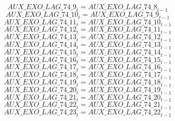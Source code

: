 \begin{dmath}
{AUX\_EXO\_LAG\_74\_9}_{t}={AUX\_EXO\_LAG\_74\_8}_{t-1}
\end{dmath}
\begin{dmath}
{AUX\_EXO\_LAG\_74\_10}_{t}={AUX\_EXO\_LAG\_74\_9}_{t-1}
\end{dmath}
\begin{dmath}
{AUX\_EXO\_LAG\_74\_11}_{t}={AUX\_EXO\_LAG\_74\_10}_{t-1}
\end{dmath}
\begin{dmath}
{AUX\_EXO\_LAG\_74\_12}_{t}={AUX\_EXO\_LAG\_74\_11}_{t-1}
\end{dmath}
\begin{dmath}
{AUX\_EXO\_LAG\_74\_13}_{t}={AUX\_EXO\_LAG\_74\_12}_{t-1}
\end{dmath}
\begin{dmath}
{AUX\_EXO\_LAG\_74\_14}_{t}={AUX\_EXO\_LAG\_74\_13}_{t-1}
\end{dmath}
\begin{dmath}
{AUX\_EXO\_LAG\_74\_15}_{t}={AUX\_EXO\_LAG\_74\_14}_{t-1}
\end{dmath}
\begin{dmath}
{AUX\_EXO\_LAG\_74\_16}_{t}={AUX\_EXO\_LAG\_74\_15}_{t-1}
\end{dmath}
\begin{dmath}
{AUX\_EXO\_LAG\_74\_17}_{t}={AUX\_EXO\_LAG\_74\_16}_{t-1}
\end{dmath}
\begin{dmath}
{AUX\_EXO\_LAG\_74\_18}_{t}={AUX\_EXO\_LAG\_74\_17}_{t-1}
\end{dmath}
\begin{dmath}
{AUX\_EXO\_LAG\_74\_19}_{t}={AUX\_EXO\_LAG\_74\_18}_{t-1}
\end{dmath}
\begin{dmath}
{AUX\_EXO\_LAG\_74\_20}_{t}={AUX\_EXO\_LAG\_74\_19}_{t-1}
\end{dmath}
\begin{dmath}
{AUX\_EXO\_LAG\_74\_21}_{t}={AUX\_EXO\_LAG\_74\_20}_{t-1}
\end{dmath}
\begin{dmath}
{AUX\_EXO\_LAG\_74\_22}_{t}={AUX\_EXO\_LAG\_74\_21}_{t-1}
\end{dmath}
\begin{dmath}
{AUX\_EXO\_LAG\_74\_23}_{t}={AUX\_EXO\_LAG\_74\_22}_{t-1}
\end{dmath}
